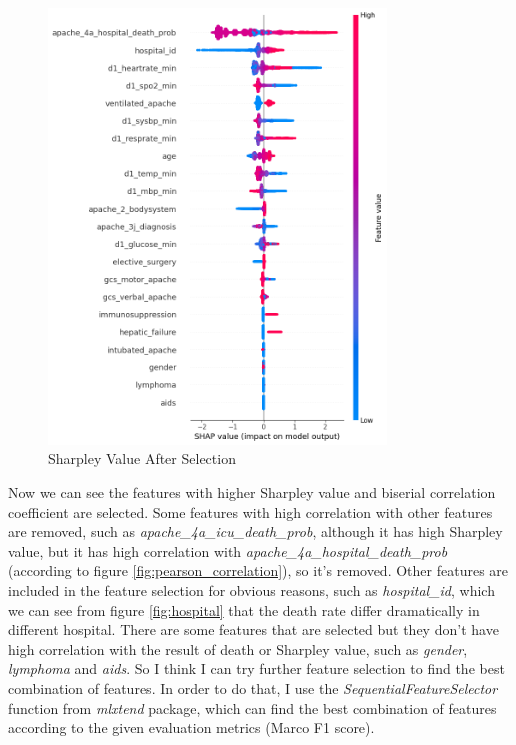 \documentclass[a4paper, oneside, final, 12pt]{scrartcl} %
\begin{document}
\begin{figure}[h]
  \centering
  \includegraphics[width=0.8\textwidth]{"./image/shap_value.png"}
  \caption{Sharpley Value After Selection}
  \label{fig:shap_value_after}
\end{figure}

Now we can see the features with higher Sharpley value and biserial correlation coefficient are selected.
Some features with high correlation with other features are removed,
such as \emph{apache\_4a\_icu\_death\_prob}, although it has high Sharpley value,
but it has high correlation with \emph{apache\_4a\_hospital\_death\_prob} 
(according to figure \ref{fig:pearson_correlation}), so it's removed.
Other features are included in the feature selection for obvious reasons,
such as \emph{hospital\_id}, which we can see from figure \ref{fig:hospital} that
the death rate differ dramatically in different hospital.
There are some features that are selected but they don't 
have high correlation with the result of death or Sharpley value,
such as \emph{gender}, \emph{lymphoma} and \emph{aids}.
So I think I can try further feature selection to find the best combination of features.
In order to do that, I use the \emph{SequentialFeatureSelector} function from \emph{mlxtend} package,
which can find the best combination of features according to the given evaluation metrics (Marco F1 score).
\end{document}
